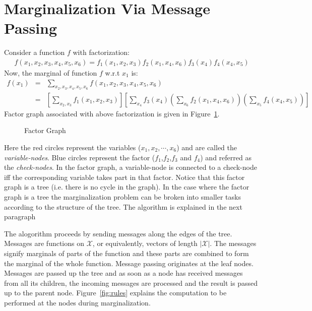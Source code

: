 \section{Marginalization Via Message Passing}
Consider a function $f$ with factorization:
\begin{align}
\ f(x_1,x_2,x_3,x_4,x_5,x_6)=f_1(x_1,x_2,x_3)f_2(x_1,x_4,x_6)f_3(x_4)f_4(x_4, x_5)
\end{align}
Now, the marginal of function $f$ w.r.t $x_1$ is:
\begin{eqnarray}
f(x_1) 	&=&\sum_{x_2, x_3, x_4, x_5, x_6} f(x_1,x_2,x_3,x_4,x_5,x_6) \\
	&=&\left[\sum_{x_2, x_3} f_1(x_1, x_2, x_3)\right]\left[\sum_{x_4}f_3(x_4)\left(\sum_{x_6}f_2(x_1, x_4, x_6)\right)\left(\sum_{x_5}f_4(x_4, x_5)\right)\right]
\end{eqnarray}
Factor graph associated with above factorization is given in Figure~\ref{fig:map0}. 
\begin{figure}[htbp]
\begin{center}

\end{center}
\caption{Factor Graph \label{fig:map0}}
\end{figure}
Here the red circles represent the variables ($x_1,x_2,\cdots,x_6$) and are called the \textit{variable-nodes}. Blue circles represent the factor ($f_1$,$f_2$,$f_3$ and $f_4$) 
and referred as the \textit{check-nodes}. In the factor graph, a variable-node is connected to a check-node iff the corresponding variable takes part in that factor.
Notice that this factor graph is a tree (i.e. there is no cycle in the graph). In the case where the factor graph is a tree the marginalization problem can be broken into smaller
tasks according to the structure of the tree. The algorithm is explained in the next paragraph

The alogorithm proceeds by sending messages along the edges of the tree. Messages are functions on $\mathcal{X}$, or equivalently, vectors of length $\left|\mathcal{X}\right|$.
The messages signify marginals of parts of the function and these parts are combined to form the marginal of the whole function. Message passing originates at the leaf nodes.
Messages are passed up the tree and as soon as a node has received messages from all its children, the incoming messages are processed and the result is passed up to the parent node.
Figure~\ref{fig:rules} explains the computation to be performed at the nodes during marginalization.

